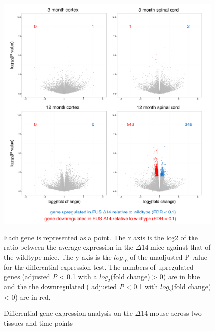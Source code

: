 \begin{figure}[h!]
	\begin{center}
		\includegraphics[width=\textwidth]{Figures/04_fus_mice/anny_volcanos.png}
	\end{center}
	\caption{Differential gene expression analysis on the $\Delta$14 mouse across two tissues and time points}
	Each gene is represented as a point. The x axis is the log2 of the ratio between the average expression in the $\Delta$14 mice against that of the wildtype mice. The y axis is the $log_10$ of the unadjusted P-value for the differential expression test. The numbers of upregulated genes (adjusted \textit{P} < 0.1 with a $log_2$(fold change) > 0) are in blue and the the downregulated ( adjusted \textit{P} < 0.1 with $log_2$(fold change) < 0) are in red.
	\label{fig:delta14_volcanos}
\end{figure}

